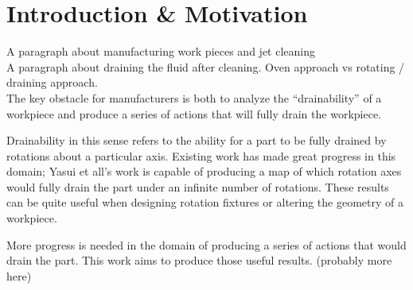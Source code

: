 							\chapter{Introduction \& Motivation}

A paragraph about manufacturing work pieces and jet cleaning
\\

A paragraph about draining the fluid after cleaning. Oven approach vs rotating / draining approach.
\\

The key obstacle for manufacturers is both to analyze the ``drainability'' of a workpiece and produce a series of actions that will fully drain the workpiece.

Drainability in this sense refers to the ability for a part to be fully drained by rotations about a particular axis. Existing work has made great progress in this domain; Yasui et all's work is capable of producing a map of which rotation axes would fully drain the part under an infinite number of rotations. These results can be quite useful when designing rotation fixtures or altering the geometry of a workpiece.

More progress is needed in the domain of producing a series of actions that would drain the part. This work aims to produce those useful results. (probably more here)